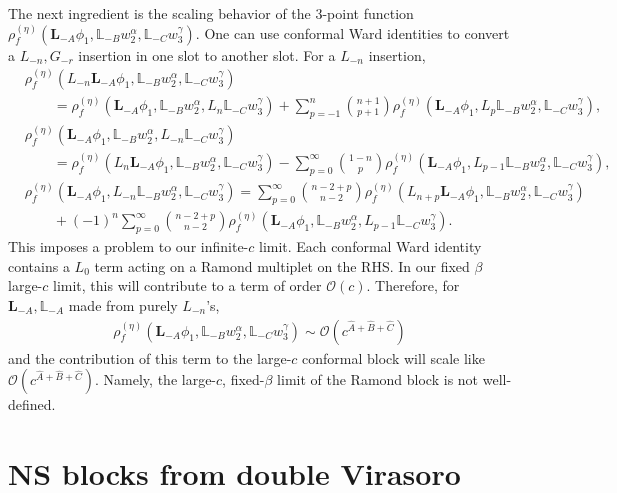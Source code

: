 \documentclass[12pt]{article}
\newcommand{\ie}{\begin{equation}\begin{aligned}}
\newcommand{\fe}{\end{aligned}\end{equation}}
\numberwithin{equation}{section}
\begin{document}
The next ingredient is the scaling behavior of the 3-point function $\rho_f^{(\eta)}(\mathbf{L}_{-A}\phi_1, \mathbb{L}_{-B}w^\alpha_2,\mathbb{L}_{-C}w^\gamma_3)$. One can use conformal Ward identities to convert a $L_{-n}, G_{-r}$ insertion in one slot to another slot. For a $L_{-n}$ insertion,
\ie
& \rho_f^{(\eta)}\left(L_{-n} \mathbf{L}_{-A} \phi_1, \mathbb{L}_{-B} w_2^\alpha, \mathbb{L}_{-C} w_3^\gamma\right) \\
& \qquad=\rho_f^{(\eta)}\left(\mathbf{L}_{-A} \phi_1, \mathbb{L}_{-B} w_2^\alpha, L_n \mathbb{L}_{-C} w_3^\gamma\right)+\sum_{p=-1}^n\binom{n+1}{p+1} \rho_f^{(\eta)}\left(\mathbf{L}_{-A} \phi_1, L_p \mathbb{L}_{-B} w_2^\alpha, \mathbb{L}_{-C} w_3^\gamma\right),\\
& \rho_f^{(\eta)}\left(\mathbf{L}_{-A} \phi_1, \mathbb{L}_{-B} w_2^\alpha, L_{-n} \mathbb{L}_{-C} w_3^\gamma\right) \\
& \qquad=\rho_f^{(\eta)}\left(L_n \mathbf{L}_{-A} \phi_1, \mathbb{L}_{-B} w_2^\alpha, \mathbb{L}_{-C} w_3^\gamma\right)-\sum_{p=0}^{\infty}\binom{1-n}{p} \rho_f^{(\eta)}\left(\mathbf{L}_{-A} \phi_1, L_{p-1} \mathbb{L}_{-B} w_2^\alpha, \mathbb{L}_{-C} w_3^\gamma\right) ,\\
&\rho_f^{(\eta)}  \left(\mathbf{L}_{-A} \phi_1, L_{-n} \mathbb{L}_{-B} w_2^\alpha, \mathbb{L}_{-C} w_3^\gamma\right) = \sum_{p=0}^{\infty}\binom{n-2+p}{n-2} \rho_f^{(\eta)}\left(L_{n+p} \mathbf{L}_{-A} \phi_1, \mathbb{L}_{-B} w_2^\alpha, \mathbb{L}_{-C} w_3^\gamma\right) \\
& \qquad+(-1)^n \sum_{p=0}^{\infty}\binom{n-2+p}{n-2} \rho_f^{(\eta)}\left(\mathbf{L}_{-A} \phi_1, \mathbb{L}_{-B} w_2^\alpha, L_{p-1} \mathbb{L}_{-C} w_3^\gamma\right) .
\fe
This imposes a problem to our infinite-$c$ limit. Each conformal Ward identity contains a $L_0$ term acting on a Ramond multiplet on the RHS. In our fixed $\beta$ large-$c$ limit, this will contribute to a term of order $\mathcal{O}(c)$. Therefore, for $\mathbf{L}_{-A}, \mathbb{L}_{-A}$ made from purely $L_{-n}$'s,
\ie
\rho_f^{(\eta)}(\mathbf{L}_{-A}\phi_1, \mathbb{L}_{-B}w^\alpha_2,\mathbb{L}_{-C}w^\gamma_3) \sim \mathcal{O}(c^{\hat{A}+\hat{B}+\hat{C}})
\fe
and the contribution of this term to the large-$c$ conformal block will scale like $\mathcal{O}(c^{\hat{A}+\hat{B}+\hat{C}})$. Namely, the large-$c$, fixed-$\beta$ limit of the Ramond block is not well-defined. 

\section{NS blocks from double Virasoro}
\end{document}
